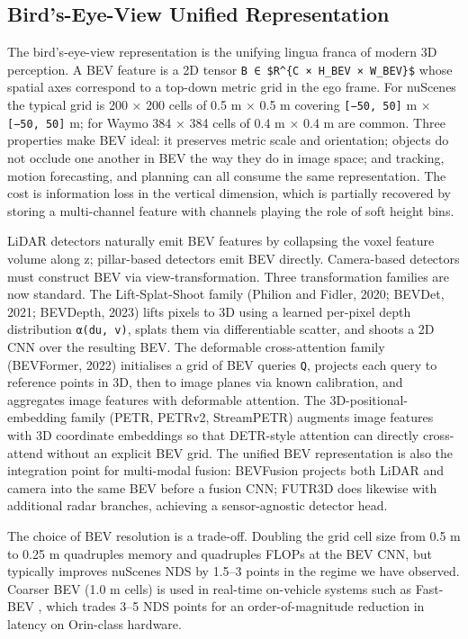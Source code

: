 \documentclass{article}
\begin{document}
\subsection{Bird's-Eye-View Unified Representation}\label{birds-eye-view-unified-representation}

The bird's-eye-view representation is the unifying lingua franca of modern 3D perception. A BEV feature is a 2D tensor \texttt{B\ ∈\ \$R\^{}\{C\ ×\ H\_BEV\ ×\ W\_BEV\}\$} whose spatial axes correspond to a top-down metric grid in the ego frame. For nuScenes the typical grid is 200 × 200 cells of 0.5 m × 0.5 m covering \texttt{{[}−50,\ 50{]}} m × \texttt{{[}−50,\ 50{]}} m; for Waymo 384 × 384 cells of 0.4 m × 0.4 m are common. Three properties make BEV ideal: it preserves metric scale and orientation; objects do not occlude one another in BEV the way they do in image space; and tracking, motion forecasting, and planning can all consume the same representation. The cost is information loss in the vertical dimension, which is partially recovered by storing a multi-channel feature with channels playing the role of soft height bins.

LiDAR detectors naturally emit BEV features by collapsing the voxel feature volume along z; pillar-based detectors emit BEV directly. Camera-based detectors must construct BEV via view-transformation. Three transformation families are now standard. The Lift-Splat-Shoot family (Philion and Fidler, 2020; BEVDet, 2021; BEVDepth, 2023) lifts pixels to 3D using a learned per-pixel depth distribution \texttt{α(d\textbar{}u,\ v)}, splats them via differentiable scatter, and shoots a 2D CNN over the resulting BEV. The deformable cross-attention family (BEVFormer, 2022) initialises a grid of BEV queries \texttt{Q}, projects each query to reference points in 3D, then to image planes via known calibration, and aggregates image features with deformable attention. The 3D-positional-embedding family (PETR, PETRv2, StreamPETR) augments image features with 3D coordinate embeddings so that DETR-style attention can directly cross-attend without an explicit BEV grid. The unified BEV representation is also the integration point for multi-modal fusion: BEVFusion \citep{liu2023bevfusionmultitask} projects both LiDAR and camera into the same BEV before a fusion CNN; FUTR3D \citep{chen2023futr3daunifiedsens} does likewise with additional radar branches, achieving a sensor-agnostic detector head.

The choice of BEV resolution is a trade-off. Doubling the grid cell size from 0.5 m to 0.25 m quadruples memory and quadruples FLOPs at the BEV CNN, but typically improves nuScenes NDS by 1.5--3 points in the regime we have observed. Coarser BEV (1.0 m cells) is used in real-time on-vehicle systems such as Fast-BEV \citep{huang2023fastbevtowardsreal}, which trades 3--5 NDS points for an order-of-magnitude reduction in latency on Orin-class hardware.
\end{document}
